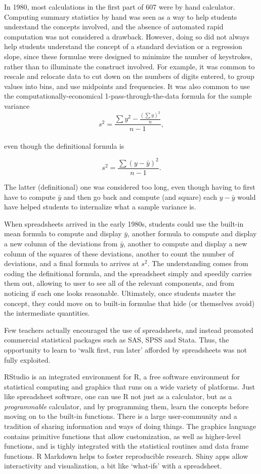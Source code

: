 \documentclass[]{book}
\begin{document}
In 1980, most calculations in the first part of 607 were by hand calculator. Computing summary statistics by hand was seen as a way to help students understand the concepts involved, and the absence of automated rapid computation was not considered a drawback. However,
doing so did not always help students understand the concept of a standard deviation or a regression slope, since these formulae were designed to minimize the number of keystrokes, rather than to illuminate the construct involved. For example, it was common to rescale and relocate data to cut down on the numbers of digits entered, to group values into bins, and use midpoints and frequencies. It was also common to use the computationally-economical 1-pass-through-the-data formula for the sample variance
\[s^2 =   \frac{ \sum y^2 - \frac{(\sum y)^2}{n}}{n-1},\]\\
even though the definitional formula is

\[s^2 = \frac{\sum(y - \bar{y})^2}{n-1}.\]

The latter (definitional) one was considered too long, even though having to first have to compute \(\bar{y}\) and then go back and compute (and square) each \(y - \bar{y}\) would have helped students to internalize what a sample variance is.

When spreadsheets arrived in the early 1980s, students could use the built-in mean formula to compute and display \(\bar{y}\), another formula to compute and display a new column of the deviations from \(\bar{y}\), another to compute and display a new column of the squares of these deviations, another to count the number of deviations, and a final formula to arrives at \(s^2.\) The understanding comes from coding the definitional formula, and the spreadsheet simply and speedily carries them out, allowing to user to see all of the relevant components, and from noticing if each one looks reasonable. Ultimately, once students master the concept, they could move on to built-in formulae that hide (or themselves avoid) the intermediate quantities.

Few teachers actually encouraged the use of spreadsheets, and instead promoted commercial statistical packages such as SAS, SPSS and Stata.
Thus, the opportunity to learn to `walk first, run later' afforded by spreadsheets was not fully exploited.

RStudio is an integrated environment for R, a free software environment for statistical computing and graphics that runs on a wide variety of platforms. Just like spreadsheet software, one can use R not just as a calculator, but as a \emph{programmable} calculator, and by programming them, learn the concepts before moving on to the built-in functions. There is a large user-community and a tradition of sharing information and ways of doing things. The graphics language contains primitive functions that allow customization, as well as higher-level functions, and is tighly integrated with the statistical routines amd data frame functions. R Markdown helps to foster reproducible research. Shiny apps allow interactivity and visualization, a bit like `what-ifs' with a spreadsheet.
\end{document}
